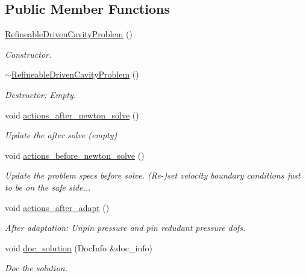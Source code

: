 \subsection*{Public Member Functions}
\begin{DoxyCompactItemize}
\item 
\hyperlink{classRefineableDrivenCavityProblem_aef71ddbff081a1f9c7f5484a6c80598a}{Refineable\+Driven\+Cavity\+Problem} ()
\begin{DoxyCompactList}\small\item\em Constructor. \end{DoxyCompactList}\item 
\hyperlink{classRefineableDrivenCavityProblem_a7d90594e973d54ee79a11fff828e124b}{$\sim$\+Refineable\+Driven\+Cavity\+Problem} ()
\begin{DoxyCompactList}\small\item\em Destructor\+: Empty. \end{DoxyCompactList}\item 
void \hyperlink{classRefineableDrivenCavityProblem_a168df1ad7b08cf8b760b6d56e9920479}{actions\+\_\+after\+\_\+newton\+\_\+solve} ()
\begin{DoxyCompactList}\small\item\em Update the after solve (empty) \end{DoxyCompactList}\item 
void \hyperlink{classRefineableDrivenCavityProblem_af83cad4653c7ac633538ebf46657659a}{actions\+\_\+before\+\_\+newton\+\_\+solve} ()
\begin{DoxyCompactList}\small\item\em Update the problem specs before solve. (Re-\/)set velocity boundary conditions just to be on the safe side... \end{DoxyCompactList}\item 
void \hyperlink{classRefineableDrivenCavityProblem_ad0dd51a90826a15f83edc2d222102852}{actions\+\_\+after\+\_\+adapt} ()
\begin{DoxyCompactList}\small\item\em After adaptation\+: Unpin pressure and pin redudant pressure dofs. \end{DoxyCompactList}\item 
void \hyperlink{classRefineableDrivenCavityProblem_a0baa1e8f1d1f6f73ef921b06a9b20836}{doc\+\_\+solution} (Doc\+Info \&doc\+\_\+info)
\begin{DoxyCompactList}\small\item\em Doc the solution. \end{DoxyCompactList}\end{DoxyCompactItemize}
